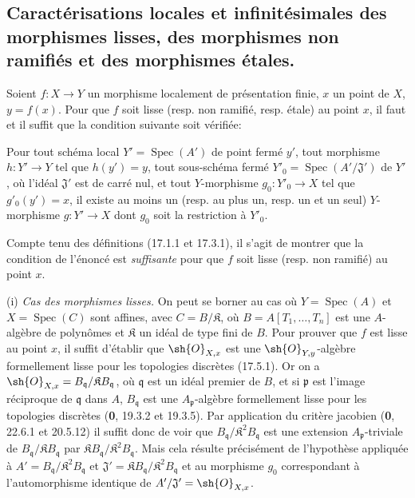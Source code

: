 \subsection{Caractérisations locales et infinitésimales des morphismes lisses, des morphismes non ramifiés et des morphismes étales.}

\begin{proposition}[17.14.1]
\label{IV.17.14.1}
Soient $f:X\to Y$ un morphisme localement de présentation finie, $x$ un point de $X$, $y=f(x)$. Pour que $f$ soit lisse \textup{(resp.} non ramifié, \textup{resp.} étale\textup{)} au point $x$, il faut et il suffit que la condition suivante soit vérifiée:

Pour tout \textup{schéma local} $Y'=\operatorname{Spec}(A')$ de point fermé $y'$, tout morphisme $h:Y'\to Y$ tel que $h(y')=y$, tout sous-schéma fermé $Y'_0=\operatorname{Spec}(A'/\mathfrak{J}')$ de $Y'$, où l'idéal $\mathfrak{J}'$ est de carré nul, et tout $Y$-morphisme $g_0:Y'_0\to X$ tel que $g'_0(y')=x$, il existe au moins un \textup{(resp.} au plus un, \textup{resp.} un et un seul\textup{)} $Y$-morphisme $g:Y'\to X$ dont $g_0$ soit la restriction à $Y'_0$.
\end{proposition}

Compte tenu des définitions (17.1.1 et 17.3.1), il s'agit de montrer que la condition de l'énoncé est \emph{suffisante} pour que $f$ soit lisse (resp. non ramifié) au point $x$.

(i) \emph{Cas des morphismes lisses.} On peut se borner au cas où $Y=\operatorname{Spec}(A)$ et $X=\operatorname{Spec}(C)$ sont affines, avec $C=B/\mathfrak{K}$, où $B=A[T_1,\ldots,T_n]$ est une $A$-algèbre de polynômes et $\mathfrak{K}$ un idéal de type fini de $B$. Pour prouver que $f$ est lisse au point $x$, il suffit d'établir que $\sh{O}_{X,x}$ est une $\sh{O}_{Y,y}$-algèbre formellement lisse pour les topologies discrètes (17.5.1). Or on a $\sh{O}_{X,x}=B_{\mathfrak q}/\mathfrak{K}B_{\mathfrak q}$, où $\mathfrak q$ est un idéal premier de $B$, et si $\mathfrak p$ est l'image réciproque de $\mathfrak q$ dans $A$, $B_{\mathfrak q}$ est une $A_{\mathfrak p}$-algèbre formellement lisse pour les topologies discrètes (\textbf{0}, 19.3.2 et 19.3.5). Par application du critère jacobien (\textbf{0}, 22.6.1 et 20.5.12) il suffit donc de voir que $B_{\mathfrak q}/\mathfrak{K}^2B_{\mathfrak q}$ est une extension $A_{\mathfrak p}$-triviale de $B_{\mathfrak q}/\mathfrak{K}B_{\mathfrak q}$ par $\mathfrak{K}B_{\mathfrak q}/\mathfrak{K}^2B_{\mathfrak q}$. Mais cela résulte précisément de l'hypothèse appliquée à $A'=B_{\mathfrak q}/\mathfrak{K}^2B_{\mathfrak q}$ et $\mathfrak{J}'=\mathfrak{K}B_{\mathfrak q}/\mathfrak{K}^2B_{\mathfrak q}$ et au morphisme $g_0$ correspondant à l'automorphisme identique de $A'/\mathfrak{J}'=\sh{O}_{X,x}$.

